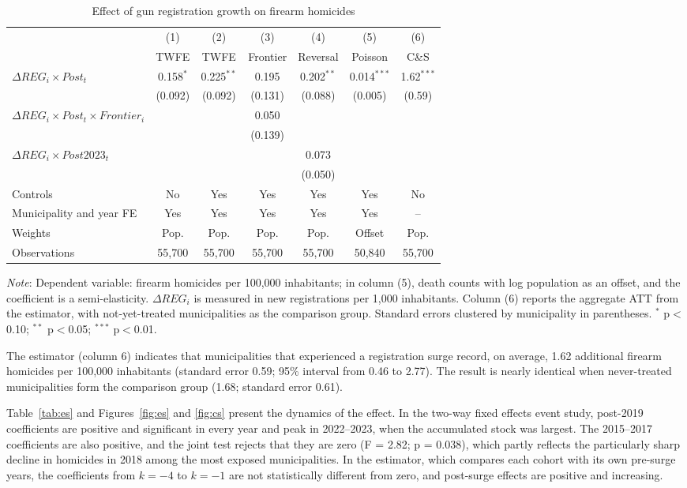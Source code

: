 \documentclass[11pt,a4paper]{article}
\newcommand{\nota}[1]{\par\vspace{2pt}\begin{minipage}{\linewidth}\footnotesize\textit{Note}: #1\end{minipage}}
\begin{document}
\begin{table}[H]
\centering\footnotesize\setlength{\tabcolsep}{4pt}
\caption{Effect of gun registration growth on firearm homicides}\label{tab:main}
\begin{tabular}{lcccccc}
\toprule
 & (1) & (2) & (3) & (4) & (5) & (6) \\
 & TWFE & TWFE & Frontier & Reversal & Poisson & C\&S \\
\midrule
$\Delta REG_i \times Post_t$ & 0.158$^{*}$ & 0.225$^{**}$ & 0.195 & 0.202$^{**}$ & 0.014$^{***}$ & 1.62$^{***}$ \\
 & (0.092) & (0.092) & (0.131) & (0.088) & (0.005) & (0.59) \\
$\Delta REG_i \times Post_t \times Frontier_i$ &  &  & 0.050 &  &  &  \\
 &  &  & (0.139) &  &  &  \\
$\Delta REG_i \times Post2023_t$ &  &  &  & 0.073 &  &  \\
 &  &  &  & (0.050) &  &  \\
\midrule
Controls & No & Yes & Yes & Yes & Yes & No \\
Municipality and year FE & Yes & Yes & Yes & Yes & Yes & -- \\
Weights & Pop. & Pop. & Pop. & Pop. & Offset & Pop. \\
Observations & 55,700 & 55,700 & 55,700 & 55,700 & 50,840 & 55,700 \\
\bottomrule
\end{tabular}
\nota{Dependent variable: firearm homicides per 100,000 inhabitants; in column (5), death counts with log population as an offset, and the coefficient is a semi-elasticity. $\Delta REG_i$ is measured in new registrations per 1,000 inhabitants. Column (6) reports the aggregate ATT from the \citet{callaway2021} estimator, with not-yet-treated municipalities as the comparison group. Standard errors clustered by municipality in parentheses. $^{*}$ p$<$0.10; $^{**}$ p$<$0.05; $^{***}$ p$<$0.01.}
\end{table}

The \citet{callaway2021} estimator (column 6) indicates that municipalities that experienced a registration surge record, on average, 1.62 additional firearm homicides per 100,000 inhabitants (standard error 0.59; 95\% interval from 0.46 to 2.77). The result is nearly identical when never-treated municipalities form the comparison group (1.68; standard error 0.61).

Table~\ref{tab:es} and Figures~\ref{fig:es} and \ref{fig:cs} present the dynamics of the effect. In the two-way fixed effects event study, post-2019 coefficients are positive and significant in every year and peak in 2022--2023, when the accumulated stock was largest. The 2015--2017 coefficients are also positive, and the joint test rejects that they are zero (F = 2.82; p = 0.038), which partly reflects the particularly sharp decline in homicides in 2018 among the most exposed municipalities. In the \citet{callaway2021} estimator, which compares each cohort with its own pre-surge years, the coefficients from $k=-4$ to $k=-1$ are not statistically different from zero, and post-surge effects are positive and increasing.
\end{document}
